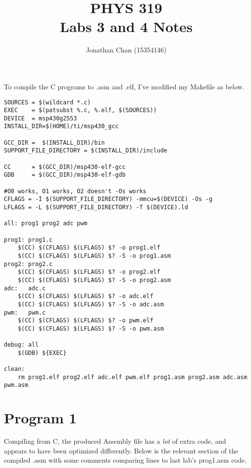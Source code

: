 \documentclass[letterpaper]{article}
\author{Jonathan Chan (15354146)}
\title{PHYS 319\\Labs 3 and 4 Notes}
\begin{document}
	\maketitle
	
	To compile the C programs to .asm and .elf, I've modified my Makefile as below.
	\begin{verbatim}
SOURCES = $(wildcard *.c)
EXEC    = $(patsubst %.c, %.elf, $(SOURCES))
DEVICE  = msp430g2553
INSTALL_DIR=$(HOME)/ti/msp430_gcc

GCC_DIR =  $(INSTALL_DIR)/bin
SUPPORT_FILE_DIRECTORY = $(INSTALL_DIR)/include

CC      = $(GCC_DIR)/msp430-elf-gcc
GDB     = $(GCC_DIR)/msp430-elf-gdb

#O0 works, O1 works, O2 doesn't -Os works
CFLAGS = -I $(SUPPORT_FILE_DIRECTORY) -mmcu=$(DEVICE) -Os -g
LFLAGS = -L $(SUPPORT_FILE_DIRECTORY) -T $(DEVICE).ld

all: prog1 prog2 adc pwm

prog1: prog1.c
    $(CC) $(CFLAGS) $(LFLAGS) $? -o prog1.elf
    $(CC) $(CFLAGS) $(LFLAGS) $? -S -o prog1.asm
prog2: prog2.c
    $(CC) $(CFLAGS) $(LFLAGS) $? -o prog2.elf
    $(CC) $(CFLAGS) $(LFLAGS) $? -S -o prog2.asm
adc:   adc.c
    $(CC) $(CFLAGS) $(LFLAGS) $? -o adc.elf
    $(CC) $(CFLAGS) $(LFLAGS) $? -S -o adc.asm
pwm:   pwm.c
    $(CC) $(CFLAGS) $(LFLAGS) $? -o pwm.elf
    $(CC) $(CFLAGS) $(LFLAGS) $? -S -o pwm.asm

debug: all
    $(GDB) ${EXEC}

clean:
    rm prog1.elf prog2.elf adc.elf pwm.elf prog1.asm prog2.asm adc.asm pwm.asm
	\end{verbatim}
	
	\section{Program 1}
		Compiling from C, the produced Assembly file has a \textit{lot} of extra code, and appears to have been optimized differently. Below is the relevant section of the compiled .asm with some comments comparing lines to last lab's prog1.asm code.
		
\end{document}

